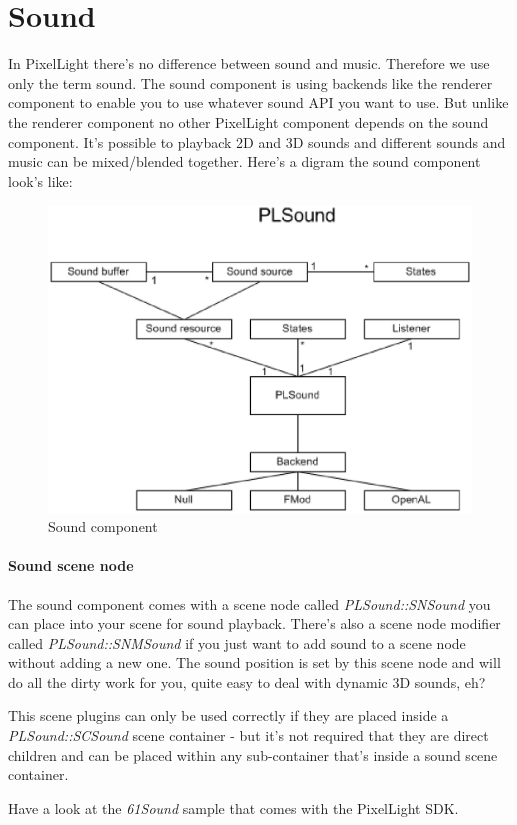 \section{Sound}
In PixelLight there's no difference between sound and music. Therefore we use only the term sound. The sound component is using backends like the renderer component to enable you to use whatever sound API you want to use. But unlike the renderer component no other PixelLight component depends on the sound component. It's possible to playback 2D and 3D sounds and different sounds and music can be mixed/blended together. Here's a digram the sound component look's like:\\
\begin{figure}
  \begin{center}
    \includegraphics{pics/PLSoundClassDiagram.eps}
  \end{center}
  \caption{Sound component}
  \label{fig:Sound component high-level UML class diagram}
\end{figure}


\paragraph{Sound scene node}
The sound component comes with a scene node called \emph{PLSound::SNSound} you can place into your scene for sound playback. There's also a scene node modifier called \emph{PLSound::SNMSound} if you just want to add sound to a scene node without adding a new one. The sound position is set by this scene node and will do all the dirty work for you, quite easy to deal with dynamic 3D sounds, eh?

This scene plugins can only be used correctly if they are placed inside a \emph{PLSound::SCSound} scene container - but it's not required that they are direct children and can be placed within any sub-container that's inside a sound scene container.

Have a look at the \emph{61Sound} sample that comes with the PixelLight SDK.
